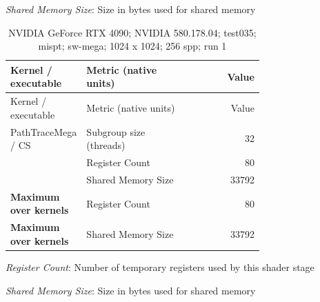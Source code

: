 \noindent\textit{Shared Memory Size}: Size in bytes used for shared memory\par
\begin{longtable}{p{0.30\linewidth}p{0.43\linewidth}r}
\caption{NVIDIA GeForce RTX 4090; NVIDIA 580.178.04; test035; mispt; sw-mega; 1024 x 1024; 256 spp; run 1}\label{tab:hydra-profile-13}\\
\hline Kernel / executable & Metric (native units) & Value \\\hline
\endfirsthead
\hline Kernel / executable & Metric (native units) & Value \\\hline
\endhead
PathTraceMega / CS & Subgroup size (threads) & 32 \\
 & Register Count & 80 \\
 & Shared Memory Size & 33792 \\
\hline
\textbf{Maximum over kernels} & Register Count & 80 \\
\textbf{Maximum over kernels} & Shared Memory Size & 33792 \\
\hline
\end{longtable}
\noindent\textit{Register Count}: Number of temporary registers used by this shader stage\par
\noindent\textit{Shared Memory Size}: Size in bytes used for shared memory\par
